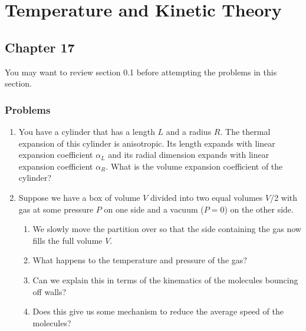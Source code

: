 \documentclass[12pt]{book}
\begin{document}
\chapter{Temperature and Kinetic Theory}

\section{Chapter 17}

You may want to review section 0.1 before attempting the problems in this section.

\subsection{Problems}
\begin{enumerate}
 \item You have a cylinder that has a length $L$ and a radius $R.$ The thermal expansion of this cylinder is anisotropic. Its length expands with linear expansion coefficient $\alpha_L$ and its radial dimension expands with linear expansion coefficient $\alpha_R.$ What is the volume expansion coefficient of the cylinder?
 \item Suppose we have a box of volume $V$ divided into two equal volumes $V$/2 with gas at some pressure $P$ on one side and a vacuum ($P = 0$) on the other side.
 \begin{enumerate}                                                                                                                                                                                                       
 \item We slowly move the partition over so that the side containing the gas now fills the full volume $V$.
 \item What happens to the temperature and pressure of the gas?
 \item Can we explain this in terms of the kinematics of the molecules bouncing off walls?
 \item Does this give us some mechanism to reduce the average speed of the molecules?
\end{enumerate}                                                                                                                                                            \end{enumerate}

\pagebreak
                                                                                                                                                                                                              
\end{document}
